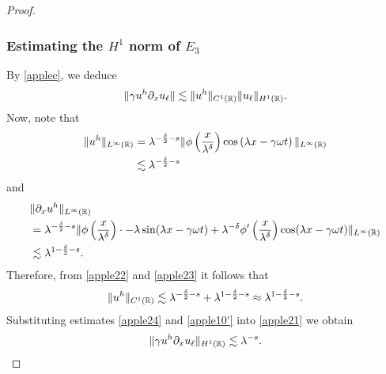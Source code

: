 \begin{proof}
\subsubsection{Estimating the $H^1$ norm of $\hyperref[all_errors_together]{E_3}$} 
By  \eqref{applec}, we deduce
\begin{equation}
	\begin{split}
		\|\gamma u^h \partial_x u_\ell \| \lesssim \|u^h\|_{C^1(\mathbb{R})}
		\|u_\ell\|_{H^1(\mathbb{R})}.
		\label{apple21}
	\end{split}
\end{equation}
Now, note that
\begin{equation}
	\begin{split}
		\|u^h\|_{L^\infty(\mathbb{R})} 
		& = \lambda^{-\frac{\delta}{2} -s } \|\phi\left( \frac{x}{\lambda^\delta}
		\right) \cos \left( \lambda x - \gamma \omega t \right) \|_{L^\infty(\mathbb{R})}
		\\
		& \lesssim \lambda^{-\frac{\delta}{2} -s }
		\label{apple22}
	\end{split}
\end{equation}
and 
\begin{equation}
	\begin{split}
		& \|\partial_x u^h \|_{L^\infty(\mathbb{R})}
		\\
		& = \lambda^{-\frac{\delta}{2}-s} \|\phi\left(
		\frac{x}{\lambda^\delta}
		\right) \cdot -\lambda \sin(\lambda x - \gamma \omega t) + \lambda^{-\delta}
		\phi'\left( \frac{x}{\lambda^\delta}\right) \cos(\lambda x - \gamma \omega
		t) \|_{L^\infty(\mathbb{R})}
		\\
		& \lesssim \lambda^{1 - \frac{\delta}{2} -s }.
		\label{apple23}
	\end{split}
\end{equation}
Therefore, from \eqref{apple22} and \eqref{apple23} it follows that
\begin{equation}
	\begin{split}
		\|u^h\|_{C^1(\mathbb{R})} \lesssim \lambda^{-\frac{\delta}{2} -s } + \lambda^{1
		-\frac{\delta}{2} -s}
		\approx \lambda^{1- \frac{\delta}{2} -s}.
		\label{apple24}
	\end{split}
\end{equation}
Substituting estimates \eqref{apple24} and  \eqref{apple10'} into \eqref{apple21} we obtain
\begin{equation}
	\begin{split}
		\|\gamma u^h \partial_x u_\ell \|_{H^1(\mathbb{R})} \lesssim \lambda^{-s}.
		\label{apple24'}
	\end{split}
\end{equation}
%

\end{proof}
